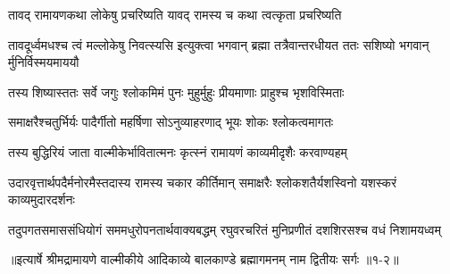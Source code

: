\twolineshloka
{तावद् रामायणकथा लोकेषु प्रचरिष्यति}
{यावद् रामस्य च कथा त्वत्कृता प्रचरिष्यति} %

\threelineshloka
{तावदूर्ध्वमधश्च त्वं मल्लोकेषु निवत्स्यसि}
{इत्युक्त्वा भगवान् ब्रह्मा तत्रैवान्तरधीयत}
{ततः सशिष्यो भगवान् र्मुनिर्विस्मयमाययौ} %

\twolineshloka
{तस्य शिष्यास्ततः सर्वे जगुः श्लोकमिमं पुनः}
{मुहुर्मुहुः प्रीयमाणाः प्राहुश्च भृशविस्मिताः} %

\twolineshloka
{समाक्षरैश्चतुर्भिर्यः पादैर्गीतो महर्षिणा}
{सोऽनुव्याहरणाद् भूयः शोकः श्लोकत्वमागतः} %

\twolineshloka
{तस्य बुद्धिरियं जाता वाल्मीकेर्भावितात्मनः}
{कृत्स्नं रामायणं काव्यमीदृशैः करवाण्यहम्} %

\twolineshloka
{उदारवृत्तार्थपदैर्मनोरमैस्तदास्य रामस्य चकार कीर्तिमान्}
{समाक्षरैः श्लोकशतैर्यशस्विनो यशस्करं काव्यमुदारदर्शनः} %

\fourlineindentedshloka
{तदुपगतसमाससंधियोगं}
{सममधुरोपनतार्थवाक्यबद्धम्}
{रघुवरचरितं मुनिप्रणीतं}
{दशशिरसश्च वधं निशामयध्वम्} %


॥इत्यार्षे श्रीमद्रामायणे वाल्मीकीये आदिकाव्ये बालकाण्डे ब्रह्मागमनम् नाम द्वितीयः सर्गः ॥१-२॥
